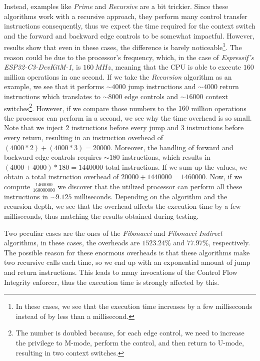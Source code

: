 Instead, examples like \textit{Prime} and \textit{Recursive} are a bit trickier.
Since these algorithms work with a recursive approach, they perform many control
transfer instructions consequently, thus we expect the time required for the context
switch and the forward and backward edge controls to be somewhat impactful.
However, results show that even in these cases, the difference is barely
noticeable\footnote{In these cases, we see that the execution time increases by a
few milliseconds instead of by less than a millisecond.}. The reason could be
due to the processor's frequency, which, in the case of \textit{Espressif's
ESP32-C3-DevKitM-1}, is $160 \ MHz$, meaning that the CPU is able to execute $160$
million operations in one second. If we take the \textit{Recursion} algorithm as
an example, we see that it performs $\sim 4000$ jump instructions and
$\sim 4000$ return instructions which translates to $\sim 8000$ edge controls
and $\sim 16000$ context switches\footnote{The number is doubled because, for each
edge control, we need to increase the privilege to M-mode, perform the control,
and then return to U-mode, resulting in two context switches.}. However, if we compare
those numbers to the $160$ million operations the processor can perform in a second,
we see why the time overhead is so small. Note that we inject $2$ instructions before
every jump and $3$ instructions before every return, resulting in an instruction
overhead of $(4000*2) + (4000*3) = 20000$. Moreover, the handling of forward and
backward edge controls requires $\sim 180$ instructions, which results in $(4000
+ 4000) * 180 = 1440000$ total instructions. If we sum up the values, we obtain a
total instruction overhead of $20000 + 1440000 = 1460000$. Now, if we compute $\frac{1460000}{160000000}$
we discover that the utilized processor can perform all these instructions in $\sim
9.125$ milliseconds. Depending on the algorithm and the recursion depth, we see that
the overhead affects the execution time by a few milliseconds, thus matching the
results obtained during testing.

Two peculiar cases are the ones of the \textit{Fibonacci} and \textit{Fibonacci
Indirect} algorithms, in these cases, the overheads are $1523.24\%$ and
$77.97\%$, respectively. The possible reason for these enormous overheads is
that these algorithms make two recursive calls each time, so we end up with an exponential
amount of jump and return instructions. This leads to many invocations of the
Control Flow Integrity enforcer, thus the execution time is strongly affected by
this.


